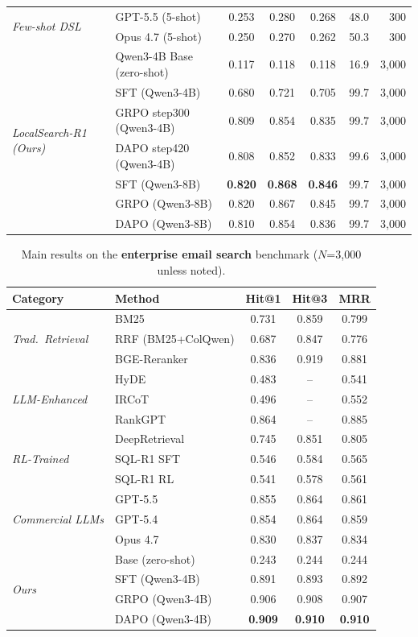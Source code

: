\begin{table}[t]
\begin{tabular}{llccccr}
\multirow{2}{*}{\textit{Few-shot DSL}}
& GPT-5.5 (5-shot) & 0.253 & 0.280 & 0.268 & 48.0 & 300 \\
& Opus 4.7 (5-shot) & 0.250 & 0.270 & 0.262 & 50.3 & 300 \\
\midrule
\multirow{7}{*}{\textit{LocalSearch-R1 (Ours)}}
& Qwen3-4B Base (zero-shot) & 0.117 & 0.118 & 0.118 & 16.9 & 3{,}000 \\
& SFT (Qwen3-4B) & 0.680 & 0.721 & 0.705 & 99.7 & 3{,}000 \\
& GRPO step300 (Qwen3-4B) & 0.809 & 0.854 & 0.835 & 99.7 & 3{,}000 \\
& DAPO step420 (Qwen3-4B) & 0.808 & 0.852 & 0.833 & 99.6 & 3{,}000 \\
& SFT (Qwen3-8B) & \textbf{0.820} & \textbf{0.868} & \textbf{0.846} & 99.7 & 3{,}000 \\
& GRPO (Qwen3-8B) & 0.820 & 0.867 & 0.845 & 99.7 & 3{,}000 \\
& DAPO (Qwen3-8B) & 0.810 & 0.854 & 0.836 & 99.7 & 3{,}000 \\
\bottomrule
\end{tabular}
\end{table}


\begin{table}[t]
\centering
\small
\caption{Main results on the \textbf{enterprise email search} benchmark ($N$=3{,}000 unless noted).}
\label{tab:main_email}
\begin{tabular}{llccc}
\toprule
\textbf{Category} & \textbf{Method} & \textbf{Hit@1} & \textbf{Hit@3} & \textbf{MRR} \\
\midrule
\multirow{3}{*}{\textit{Trad.\ Retrieval}}
& BM25 & 0.731 & 0.859 & 0.799 \\
& RRF (BM25+ColQwen) & 0.687 & 0.847 & 0.776 \\
& BGE-Reranker & 0.836 & 0.919 & 0.881 \\
\midrule
\multirow{3}{*}{\textit{LLM-Enhanced}}
& HyDE & 0.483 & -- & 0.541 \\
& IRCoT & 0.496 & -- & 0.552 \\
& RankGPT & 0.864 & -- & 0.885 \\
\midrule
\multirow{3}{*}{\textit{RL-Trained}}
& DeepRetrieval & 0.745 & 0.851 & 0.805 \\
& SQL-R1 SFT & 0.546 & 0.584 & 0.565 \\
& SQL-R1 RL & 0.541 & 0.578 & 0.561 \\
\midrule
\multirow{3}{*}{\textit{Commercial LLMs}}
& GPT-5.5 & 0.855 & 0.864 & 0.861 \\
& GPT-5.4 & 0.854 & 0.864 & 0.859 \\
& Opus 4.7 & 0.830 & 0.837 & 0.834 \\
\midrule
\multirow{6}{*}{\textit{Ours}}
& Base (zero-shot) & 0.243 & 0.244 & 0.244 \\
& SFT (Qwen3-4B) & 0.891 & 0.893 & 0.892 \\
& GRPO (Qwen3-4B) & 0.906 & 0.908 & 0.907 \\
& DAPO (Qwen3-4B) & \textbf{0.909} & \textbf{0.910} & \textbf{0.910} \\
\bottomrule
\end{tabular}
\end{table}


